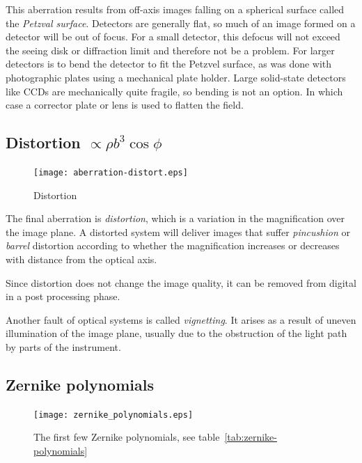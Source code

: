 This aberration results from off-axis images falling on a spherical surface called the
{\it Petzval surface}. Detectors are generally flat, so much of an image formed on a 
detector will be out of focus. For a small detector, this defocus will not exceed the 
seeing disk or diffraction limit and therefore not be a problem. For larger detectors
is to bend the detector to fit the Petzvel surface, as was done with photographic plates
using a mechanical plate holder. Large solid-state detectors like CCDs are mechanically 
quite fragile, so bending is not an option. In which case a corrector plate or lens is
used to flatten the field.

\subsection{Distortion $\propto \rho b^3\cos\phi$}

\begin{figure}[th!]
	\centering
	\texttt{[image: aberration-distort.eps]}
  \caption{Distortion}
  \label{fig:aberration-distortion}
\end{figure}

The final aberration is {\it distortion}, which is a variation in the 
magnification over the image plane. A distorted system will deliver images
that suffer {\it pincushion} or {\it barrel} distortion according to 
whether the magnification increases or decreases with distance from the 
optical axis.

Since distortion does not change the image quality, it can be removed from 
digital in a post processing phase.

Another fault of optical systems is called {\it vignetting}. It arises as a result
of uneven illumination of the image plane, usually due to the obstruction of 
the light path by parts of the instrument.

\subsection{Zernike polynomials}

\begin{figure}[th!]
	\centering
	\texttt{[image: zernike\_polynomials.eps]}
  \caption{The first few Zernike polynomials, see table~\ref{tab:zernike-polynomials} 
}
 \label{fig:zernike-polynomials}
\end{figure}

